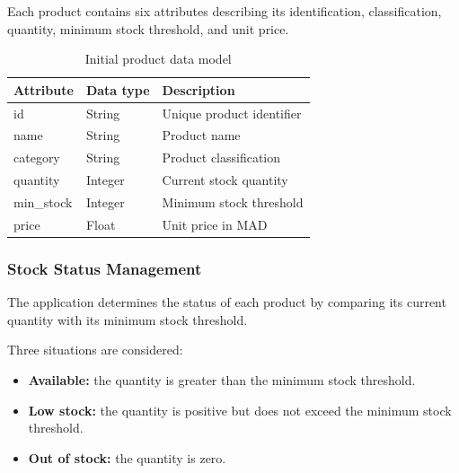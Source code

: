 Each product contains six attributes describing its
identification, classification, quantity, minimum stock
threshold, and unit price.

\begin{table}[htbp]
    \centering

    \begin{tabular}{lll}
        \toprule

        \textbf{Attribute} &
        \textbf{Data type} &
        \textbf{Description} \\

        \midrule

        id & String & Unique product identifier \\
        name & String & Product name \\
        category & String & Product classification \\
        quantity & Integer & Current stock quantity \\
        min\_stock & Integer & Minimum stock threshold \\
        price & Float & Unit price in MAD \\

        \bottomrule
    \end{tabular}

    \caption{Initial product data model}
    \label{tab:product-model}

\end{table}

\subsubsection{Stock Status Management}

The application determines the status of each product
by comparing its current quantity with its minimum stock
threshold.

Three situations are considered:

\begin{itemize}
    \item \textbf{Available:} the quantity is greater
    than the minimum stock threshold.

    \item \textbf{Low stock:} the quantity is positive
    but does not exceed the minimum stock threshold.

    \item \textbf{Out of stock:} the quantity is zero.
\end{itemize}

